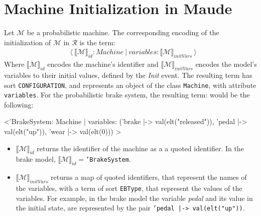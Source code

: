 \section{Machine Initialization in Maude}
Let $\mathscr{M}$ be a probabilistic machine. The corresponding encoding of the initialization of $\mathscr{M}$ in $\mathscr{R}$ is the term:
    \begin{align*}
    & \langle \ \llbracket \mathscr{M} \rrbracket_{id} : Machine \ | \ variables: \llbracket \mathscr{M} \rrbracket_{initVars} \ \rangle 
    \end{align*}
Where $\llbracket \mathscr{M} \rrbracket_{id}$ encodes the machine's identifier and $\llbracket \mathscr{M} \rrbracket_{initVars}$ encodes the model's variables to their initial values, defined by the \textit{Init} event. The resulting term has sort \texttt{CONFIGURATION}, and represents an object of the class \texttt{Machine}, with attribute \texttt{variables}. For the probabilistic brake system, the resulting term: would be the following:

\begin{maude}

<'BrakeSystem: Machine | variables: ('brake |-> val(elt("released")), 
                                     'pedal |-> val(elt("up")), 
                                     'wear |-> val(elt(0))) >
\end{maude}

\begin{itemize}
    \item $\llbracket \mathscr{M} \rrbracket_{id}$ returns the identifier of the machine as a a quoted identifier. In the brake model, $\llbracket \mathscr{M} \rrbracket_{id} = $\texttt{'BrakeSystem}.
    \item $\llbracket \mathscr{M} \rrbracket_{initVars}$ returns a map of quoted identifiers, that represent the names of the variables, with a term of sort \texttt{EBType}, that represent the values of the variables. For example, in the brake model the variable \textit{pedal} and its value in the initial state, are represented by the pair \texttt{'pedal |-> val(elt("up"))}.
\end{itemize}

